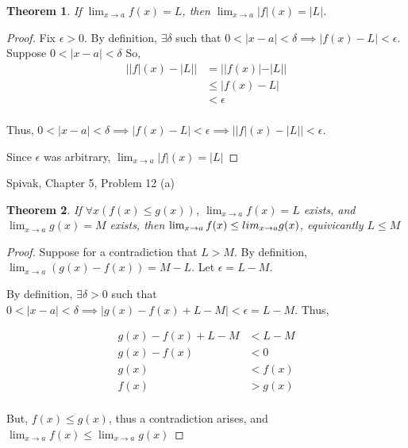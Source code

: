 \documentclass{article} %
\theoremstyle{plain}
\newtheorem*{theorem*}{Theorem}
\theoremstyle{definition}
\begin{document}
\begin{theorem*} If $\lim_{x \to a} f(x) = L$, then $\lim_{x \to a} |f|(x) = |L|$.
\end{theorem*}

\begin{proof} 
    Fix $\epsilon > 0$.  By definition, $\exists \delta$ such that $0 < |x-a| < \delta \implies |f(x) - L| < \epsilon$.
    Suppose $0 < |x-a| < \delta$
    So,
    \begin{align*}
        | |f|(x) - |L| | &= | |f(x)| - |L| | \\
                         &\leq |f(x) - L| \\
                         & < \epsilon \\
    \end{align*}

    Thus, $0 < |x-a| < \delta \implies |f(x) - L| < \epsilon \implies | |f|(x) - |L| | < \epsilon$.

    Since $\epsilon$ was arbitrary, $\lim_{x \to a} |f|(x) = |L|$
\end{proof} 

\noindent{} Spivak, Chapter 5, Problem 12 (a) 

\begin{theorem*} If $\forall x (f(x) \leq g(x))$, $\lim_{x \to a} f(x) = L$ exists, and $\lim_{x \to a} g(x) = M$ exists, then $\lim_{x \to a} f(x) \leq \\lim_{x \to a} g(x)$, equivicantly $L \leq M$
\end{theorem*}

\begin{proof}
    Suppose for a contradiction that $L > M$. By definition, $\lim_{x \to a} (g(x) - f(x)) = M - L$.  Let $\epsilon = L - M$.

    By definition, $\exists \delta > 0$ such that $0 < |x - a| < \delta \implies |g(x) - f(x) + L - M| < \epsilon = L-M$. Thus,

    \begin{align*}
        g(x) - f(x) + L - M & < L - M \\
        g(x) - f(x) & < 0 \\
        g(x) & < f(x) \\
        f(x) & > g(x) \\
    \end{align*}

    But, $f(x) \leq g(x)$, thus a contradiction arises, and $\lim_{x \to a} f(x) \leq \lim_{x \to a} g(x)$
\end{proof} 
\end{document}
